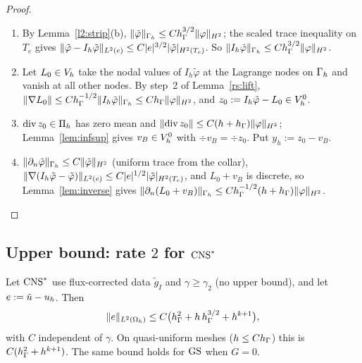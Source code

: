 \begin{proof}
\begin{enumerate}
\item By Lemma~\ref{l2:strip}(b), $\lVert \tilde\varphi\rVert_{\Gamma_h}\le Ch_\Gamma^{3/2}\lVert \varphi\rVert_{H^2}$; the scaled trace inequality on $T_e$ gives $\lVert \tilde\varphi-I_h\tilde\varphi\rVert_{L^2(e)}\le C|e|^{3/2}|\tilde\varphi|_{H^2(T_e)}$. So $\lVert I_h\tilde\varphi\rVert_{\Gamma_h}\le Ch_\Gamma^{3/2}\lVert \varphi\rVert_{H^2}$.
\item Let $L_0\in V_h$ take the nodal values of $I_h\tilde\varphi$ at the Lagrange nodes on $\Gamma_h$ and vanish at all other nodes. By step~2 of Lemma~\ref{rs:lift}, $\lVert \nabla L_0\rVert\le Ch_\Gamma^{-1/2}\lVert I_h\tilde\varphi\rVert_{\Gamma_h}\le Ch_\Gamma\lVert \varphi\rVert_{H^2}$, and $z_0:=I_h\tilde\varphi-L_0\in V_h^0$.
\item $\operatorname{div} z_0\in\Pi_h$ has zero mean and $\lVert \operatorname{div} z_0\rVert\le C(h+h_\Gamma)\lVert \varphi\rVert_{H^2}$; Lemma~\ref{lem:infsup} gives $v_B\in V_h^0$ with $\div v_B=\div z_0$. Put $y_h:=z_0-v_B$.
\item $\lVert \partial_n\tilde\varphi\rVert_{\Gamma_h}\le C\lVert \tilde\varphi\rVert_{H^2}$ (uniform trace from the collar), $\lVert \nabla(I_h\tilde\varphi-\tilde\varphi)\rVert_{L^2(e)}\le C|e|^{1/2}|\tilde\varphi|_{H^2(T_e)}$, and $L_0+v_B$ is discrete, so Lemma~\ref{lem:inverse} gives $\lVert \partial_n(L_0+v_B)\rVert_{\Gamma_h}\le Ch_\Gamma^{-1/2}(h+h_\Gamma)\lVert \varphi\rVert_{H^2}$.\qedhere
\end{enumerate}
\end{proof}

\subsection{Upper bound: rate \texorpdfstring{$2$}{2} for \texorpdfstring{$\mathrm{CNS}^\ast$}{CNS*}}

\begin{theorem}\label{l2:thm:L1}
Let $\mathrm{CNS}^\ast$ use flux-corrected data $\tilde g_I$ and $\gamma\ge\gamma_2$ (no upper bound), and let $e:=\tilde u-u_h$. Then
\[
\lVert e\rVert_{L^2(\Omega_h)}\le C\bigl(h_\Gamma^2+h\,h_\Gamma^{3/2}+h^{k+1}\bigr),
\]
with $C$ independent of $\gamma$. On quasi-uniform meshes ($h\le Ch_\Gamma$) this is $C(h_\Gamma^2+h^{k+1})$. The same bound holds for $\mathrm{GS}$ when $G=0$.
\end{theorem}

